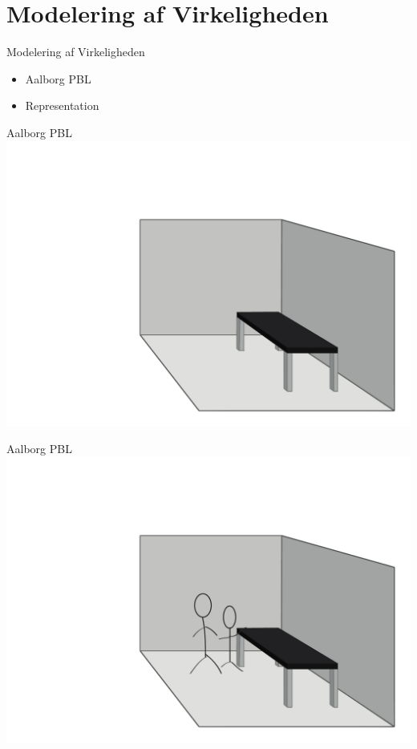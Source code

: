 \newcommand{\modelreality}{Modelering af Virkeligheden}
\newcommand{\topicone}{Aalborg PBL}
\newcommand{\topictwo}{Representation}
\section*{\modelreality}

\begin{frame}{\modelreality}
\begin{itemize}
	\item \topicone
	\item \topictwo
\end{itemize}
\end{frame}
\begin{frame}{\topicone} 
\includegraphics[width=\columnwidth]{input/rasmus/Rasmus1.pdf}
\end{frame}
\begin{frame}{\topicone} 
\includegraphics[width=\columnwidth]{input/rasmus/Rasmus2.pdf}
\end{frame}

